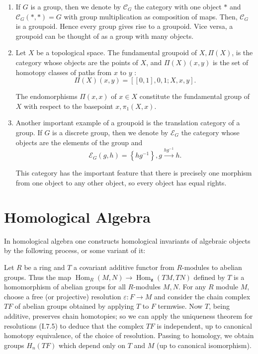 \begin{example}
    \begin{enumerate}
        \item If $G$ is a group, then we denote by $\mathcal{C}_G$ the category with one object $*$ and $\mathcal{C}_G(*, *)=G$ with group multiplication as composition of maps. Then, $\mathcal{C}_G$ is a groupoid. Hence every group gives rise to a groupoid. Vice versa, a groupoid can be thought of as a group with many objects.
        \item Let $X$ be a topological space. The fundamental groupoid of $X, \Pi(X)$, is the category whose objects are the points of $X$, and $\Pi(X)(x, y)$ is the set of homotopy classes of paths from $x$ to $y$ :
        $$
        \Pi(X)(x, y)=[[0,1], 0,1 ; X, x, y] .
        $$
        
        The endomorphisms $\Pi(x, x)$ of $x \in X$ constitute the fundamental group of $X$ with respect to the basepoint $x, \pi_1(X, x)$.
        \item Another important example of a groupoid is the translation category of a group. If $G$ is a discrete group, then we denote by $\mathcal{E}_G$ the category whose objects are the elements of the group and $$\mathcal{E}_G(g, h)=\left\{h g^{-1}\right\}, g \xrightarrow{h g^{-1}} h.$$

        This category has the important feature that there is precisely one morphism from one object to any other object, so every object has equal rights.

    \end{enumerate}
\end{example}






















\chapter{Homological Algebra}

In homological algebra one constructs homological invariants of algebraic objects by the following process, or some variant of it:

Let $R$ be a ring and $T$ a covariant additive functor from $R$-modules to abelian groups. Thus the map $\operatorname{Hom}_R(M, N) \rightarrow \operatorname{Hom}_{\mathbf{z}}(T M, T N)$ defined by $T$ is a homomorphism of abelian groups for all $R$-modules $M, N$. For any $R$ module $M$, choose a free (or projective) resolution $\varepsilon: F \rightarrow M$ and consider the chain complex $T F$ of abelian groups obtained by applying $T$ to $F$ termwise. Now $T$, being additive, preserves chain homotopies; so we can apply the uniqueness theorem for resolutions (I.7.5) to deduce that the complex $T F$ is independent, up to canonical homotopy equivalence, of the choice of resolution. Passing to homology, we obtain groups $H_n(T F)$ which depend only on $T$ and $M$ (up to canonical isomorphism).

